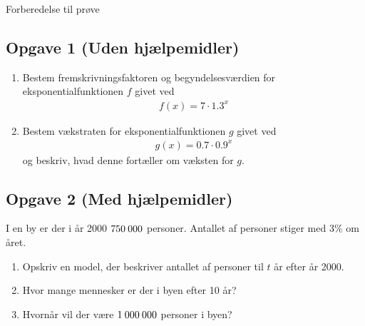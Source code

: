 \documentclass[12pt]{article}
\begin{document}








\begin{center}
\Huge
Forberedelse til prøve	
\end{center}

\subsection*{Opgave 1 (Uden hjælpemidler)}

\begin{enumerate}[label=\roman*)]
	\item Bestem fremskrivningsfaktoren og begyndelsesværdien for eksponentialfunktionen $f$ givet ved
	\begin{align*}
		f(x) = 7\cdot 1.3^x
	\end{align*}
	\item Bestem vækstraten for eksponentialfunktionen $g$ givet ved
	\begin{align*}
		g(x) = 0.7\cdot 0.9^x
	\end{align*}
	og beskriv, hvad denne fortæller om væksten for $g$. 
\end{enumerate}


\subsection*{Opgave 2 (Med hjælpemidler)}

I en by er der i år 2000 $750\hspace{0.8mm} 000$ personer. Antallet af personer stiger med 3$\%$ om året.
\begin{enumerate}[label = \roman*)]
	\item Opskriv en model, der beskriver antallet af personer til $t$ år efter år 2000.
	\item Hvor mange mennesker er der i byen efter 10 år?
	\item Hvornår vil der være $1\hspace{0.8mm} 000\hspace{0.8mm} 000$ personer i byen?
\end{enumerate}
\end{document}
